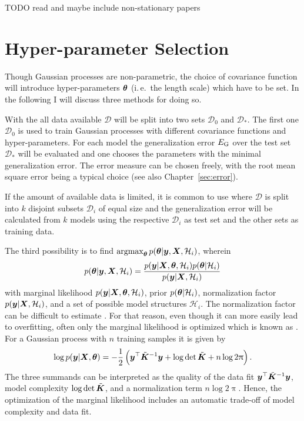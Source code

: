 TODO read and maybe include non-stationary papers

\section{Hyper-parameter Selection}
Though Gaussian processes are non-parametric, the choice of covariance function 
will introduce hyper-parameters $\bm{\theta}$ (i.\,e.~the length scale) which have 
to be set.  In the following I will discuss three methods for doing so.

With the  all data available $\mathcal{D}$ will be 
split into two sets $\mathcal{D}_0$ and $\mathcal{D}_*$. The first one 
$\mathcal{D}_0$ is used to train Gaussian processes with different covariance 
functions and hyper-parameters. For each model the generalization error 
$E_{\mathrm{G}}$ over the test set $\mathcal{D}_*$ will be evaluated and one chooses 
the parameters with the minimal generalization error. The error measure can be 
chosen freely, with the root mean square error being a typical choice (see also 
Chapter~\ref{sec:error}).

If the amount of available data is limited, it is common to use 
 where $\mathcal{D}$ is split into $k$ 
disjoint subsets $\mathcal{D}_i$ of equal size and the generalization error will 
be calculated from $k$ models using the respective $\mathcal{D}_i$ as test set 
and the other sets as training data.

The third possibility is to find $\operatorname*{argmax}_{\bm{\theta}} p(\bm{\theta} | \bm{y}, \bm{X}, \mathcal{H}_i)$, wherein
\begin{equation}
    p(\bm{\theta} | \bm{y}, \bm{X}, \mathcal{H}_i) = \frac{p(\bm{y} | \bm{X}, 
        \bm{\theta}, \mathcal{H}_i) p(\bm{\theta} | \mathcal{H}_i)}{p(\bm{y} | \bm{X}, \mathcal{H}_i)}
\end{equation}
with marginal likelihood $p(\bm{y} | \bm{X}, \bm{\theta}, \mathcal{H}_i)$, prior 
$p(\bm{\theta} | \mathcal{H}_i)$, normalization factor $p(\bm{y} | \bm{X}, 
\mathcal{H}_i)$, and a set of possible model structures $\mathcal{H}_i$. The 
normalization factor can be difficult to estimate 
\parencite[109]{Rasmussen:2006vz}. For that reason, even though it can more 
easily lead to overfitting, often only the marginal likelihood is optimized 
which is known as . For a Gaussian 
process with $n$ training samples it is given by
\begin{equation}
    \log p(\vc y | \mat X, \vc\theta) = -\frac{1}{2}\del{\vc y\Tr 
        \tilde{\mat{K}}^{-1} \vc y + \log \det \tilde{\mat K} + n \log 2\uppi} 
    \text{.}
\end{equation}
The three summands can be interpreted as the quality of the data fit $\bm{y}^{\top} 
\tilde{\bm{K}}^{-1} \bm{y}$, model complexity $\log \det \tilde{\bm{K}}$, and 
a normalization term $n \log 2\uppi$. Hence, the optimization of the marginal 
likelihood includes an automatic trade-off of model complexity and data fit.


